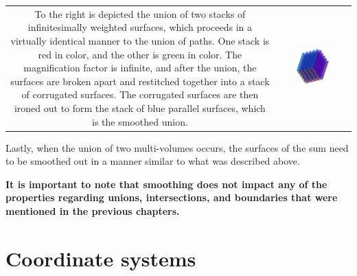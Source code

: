 \documentclass{book}
\begin{document}
\begin{tabular}{cc}
\parbox{0.5\textwidth}{
To the right is depicted the union of two stacks of infinitesimally weighted surfaces, which proceeds in a virtually identical manner to the union of paths. One stack is red in color, and the other is green in color. The magnification factor is infinite, and after the union, the surfaces are broken apart and restitched together into a stack of corrugated surfaces. The corrugated surfaces are then ironed out to form the stack of blue parallel surfaces, which is the smoothed union.
} & \parbox{0.5\textwidth}{
\includegraphics[width = 0.5\textwidth]{Smoothness_and_duality/surface_union_smoothing}
}
\end{tabular}

Lastly, when the union of two multi-volumes occurs, the surfaces of the sum need to be smoothed out in a manner similar to what was described above.

{\bf It is important to note that smoothing does not impact any of the properties regarding unions, intersections, and boundaries that were mentioned in the previous chapters.}





\section{Coordinate systems}
\end{document}
